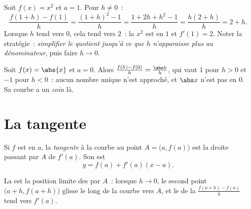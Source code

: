 \begin{example}\label{ex:g11:deriv:atpoint}
Soit $f(x) = x^2$ et $a = 1$. Pour $h \neq 0$~:
\[
\frac{f(1+h) - f(1)}{h}
= \frac{(1+h)^2 - 1}{h}
= \frac{1 + 2h + h^2 - 1}{h}
= \frac{h(2 + h)}{h}
= 2 + h .
\]
Lorsque $h$ tend vers $0$, cela tend vers $2$~: la  $x^2$ est
 en $1$ et $f'(1) = 2$. Noter la stratégie~: \emph{simplifier
le quotient jusqu'à ce que $h$ n'apparaisse plus au dénominateur}, puis
faire $h \to 0$.
\end{example}

\begin{example}
Soit $f(x) = \abs{x}$ et $a = 0$. Alors
$\frac{f(h) - f(0)}{h} = \frac{\abs h}{h}$, qui vaut $1$ pour $h > 0$ et
$-1$ pour $h < 0$~: aucun nombre unique n'est approché, et $\abs x$
n'est pas  en $0$. Sa courbe a un \emph{coin} là.
\end{example}

\section{La tangente}

\begin{definition}[Tangente]\label{def:g11:deriv:tangent}
Si $f$ est  en $a$, la \emph{tangente} à la
courbe au point $A = \bigl(a, f(a)\bigr)$ est la droite passant par $A$
de  $f'(a)$. Son  est
\[
y = f(a) + f'(a)(x - a).
\]
\end{definition}

La  est la position limite des  par $A$~: lorsque
$h \to 0$, le second point $\bigl(a+h, f(a+h)\bigr)$ glisse le long de la
courbe vers $A$, et le  de la 
$\frac{f(a+h)-f(a)}{h}$ tend vers $f'(a)$.

